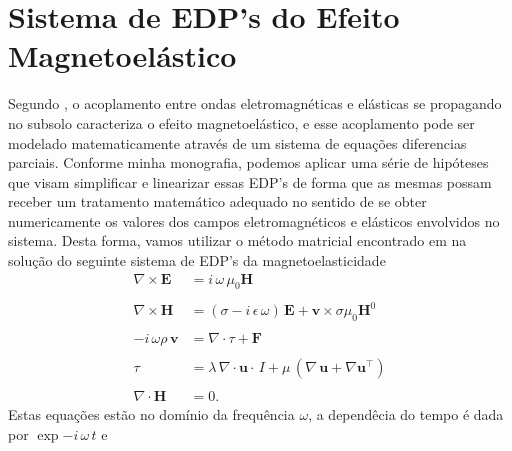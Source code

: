 \section{Sistema de EDP's do Efeito Magnetoel\'astico}

Segundo \cite{eringen_1963}, o acoplamento entre ondas eletromagn\'eticas e el\'asticas se propagando no subsolo caracteriza o efeito magnetoel\'astico, e esse acoplamento pode ser modelado matematicamente atrav\'es de um sistema de equa\c{c}\~oes diferencias parciais. Conforme minha monografia, podemos aplicar uma s\'erie de hip\'oteses que visam simplificar e linearizar essas EDP's de forma que as mesmas possam receber um tratamento matem\'atico adequado no sentido de se obter numericamente os valores dos campos eletromagn\'eticos e el\'asticos envolvidos no sistema. Desta forma, vamos utilizar o m\'etodo matricial encontrado em \cite{Ursin-1983} na solu\c{c}\~ao do seguinte sistema de EDP's da magnetoelasticidade
\begin{align*}
\nabla\times\mathbf{{E}}&=i\,\omega\,\mu_0\mathbf{{H}}\\\\
\nabla\times\mathbf{{H}}&=(\sigma-i\,\epsilon\,\omega)\,\mathbf{{E}}+\mathbf{{v}}\times\sigma\mu_0\mathbf{H}^0\\\\
-i\,\omega\rho\,\mathbf{{v}}&=\nabla\cdot{\tau} + \mathbf{{F}}\\\\
{\tau}&=\lambda\,\nabla\cdot\mathbf{{u}}\cdot\,I + \mu\,(\nabla\,\mathbf{{u}}+\nabla\mathbf{{u}}^\top)\\\\
\nabla\cdot\mathbf{{H}}&=0.
\end{align*}
Estas equa\c{c}\~oes est\~ao no dom\'inio da frequ\^encia $\omega$, a depend\^ecia do tempo \'e dada por $\exp{-i\,\omega\,t}$ e 
